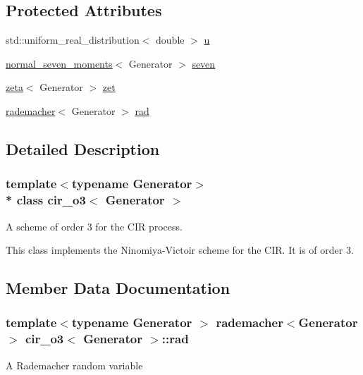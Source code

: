 \subsection*{Protected Attributes}
\begin{DoxyCompactItemize}
\item 
std\+::uniform\+\_\+real\+\_\+distribution$<$ double $>$ \hyperlink{classcir__o3_a0e08c2c516a7f821a4a3ee8f9b0cf162}{u}
\item 
\hyperlink{classnormal__seven__moments}{normal\+\_\+seven\+\_\+moments}$<$ Generator $>$ \hyperlink{classcir__o3_a22d7ad16bc9bfb168095ab16ff0bc685}{seven}
\item 
\hyperlink{classzeta}{zeta}$<$ Generator $>$ \hyperlink{classcir__o3_aff6081fa06fbab8fd8bf06bbef2bf7c4}{zet}
\item 
\hyperlink{classrademacher}{rademacher}$<$ Generator $>$ \hyperlink{classcir__o3_a5ed2b331f33db9c48fde052e1a15a1d1}{rad}
\end{DoxyCompactItemize}


\subsection{Detailed Description}
\subsubsection*{template$<$typename Generator$>$\\*
class cir\+\_\+o3$<$ Generator $>$}

A scheme of order 3 for the C\+IR process. 

This class implements the Ninomiya-\/\+Victoir scheme for the C\+IR. It is of order 3. 

\subsection{Member Data Documentation}
\subsubsection[{\texorpdfstring{rad}{rad}}]{\setlength{\rightskip}{0pt plus 5cm}template$<$typename Generator $>$ {\bf rademacher}$<$Generator$>$ {\bf cir\+\_\+o3}$<$ Generator $>$\+::rad\hspace{0.3cm}{\ttfamily [protected]}}\hypertarget{classcir__o3_a5ed2b331f33db9c48fde052e1a15a1d1}{}\label{classcir__o3_a5ed2b331f33db9c48fde052e1a15a1d1}
A Rademacher random variable 
